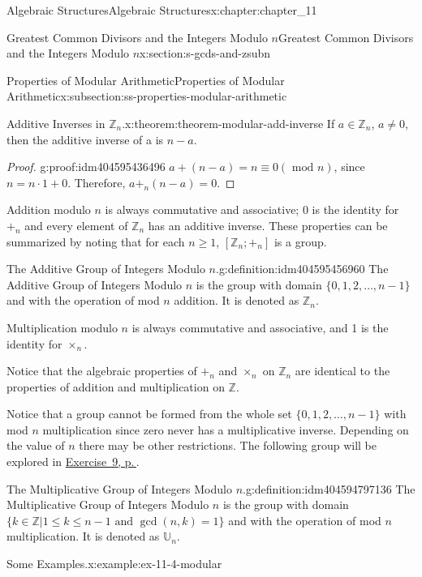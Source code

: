 \documentclass[twoside,10pt,]{book}
\numberwithin{equation}{section}
\begin{document}
\begin{chapterptx}{Algebraic Structures}{}{Algebraic Structures}{}{}{x:chapter:chapter_11}
\begin{sectionptx}{Greatest Common Divisors  and the Integers Modulo \(n\)}{}{Greatest Common Divisors  and the Integers Modulo \(n\)}{}{}{x:section:s-gcds-and-zsubn}
\begin{subsectionptx}{Properties of Modular Arithmetic}{}{Properties of Modular Arithmetic}{}{}{x:subsection:ss-properties-modular-arithmetic}
\begin{theorem}{Additive Inverses in \(\mathbb{Z}_n\).}{}{x:theorem:theorem-modular-add-inverse}
If \(a \in  \mathbb{Z}_n\), \(a\neq 0\), then the additive inverse of a is \(n - a\).%
\end{theorem}
\begin{proof}{}{g:proof:idm404595436496}
\(a + (n - a) =n\equiv 0(\textrm{ mod } n)\), since  \(n = n\cdot 1 + 0\).  Therefore,  \(a+_n(n-a)=0\).%
\end{proof}
Addition modulo \(n\) is always commutative and associative; 0 is the identity for \(+_n\) and every element of \(\mathbb{Z}_n\) has an additive inverse.  These properties can be summarized by noting that for each \(n\geq 1\), \(\left[\mathbb{Z}_n; +_n\right]\) is a group.%
\begin{definition}{The Additive Group of Integers Modulo \(n\).}{g:definition:idm404595456960}%
%
\label{g:notation:idm404594806256}%
The Additive Group of Integers Modulo \(n\) is the group with domain \(\{0, 1, 2, \dots, n-1\}\) and with the operation of mod \(n\) addition. It is  denoted as \(\mathbb{Z}_n\).%
\end{definition}
Multiplication modulo \(n\) is always commutative and associative, and 1 is the identity for \(\times_n\).%
\par
Notice that the algebraic properties of \(+_n\) and \(\times_n\) on \(\mathbb{Z}_n\) are identical to the properties of addition and multiplication on \(\mathbb{Z}\).%
\par
Notice that a group cannot be formed from the whole set \(\{0, 1, 2, \dots, n-1\}\) with mod \(n\) multiplication since zero never has a multiplicative inverse.  Depending on the value of \(n\) there may be other restrictions. The following group will be explored in \hyperlink{x:exercise:exercise_u_n}{Exercise~9, p.\,\pageref{x:exercise:exercise_u_n}}.%
\begin{definition}{The Multiplicative Group of Integers Modulo \(n\).}{g:definition:idm404594797136}%
%
\label{g:notation:idm404594796528}%
The Multiplicative Group of Integers Modulo \(n\) is the group with domain \(\{k\in \mathbb{Z} \vert  1 \leq k \leq n-1 \textrm{ and }\gcd(n,k)=1\}\) and with the operation of mod \(n\) multiplication.  It is  denoted as \(\mathbb{U}_n\).%
\end{definition}
\begin{example}{Some Examples.}{x:example:ex-11-4-modular}%
%
\begin{enumerate}[label=(\alph*)]

\end{enumerate}
\end{example}
\end{subsectionptx}
\end{sectionptx}
\end{chapterptx}
\end{document}
